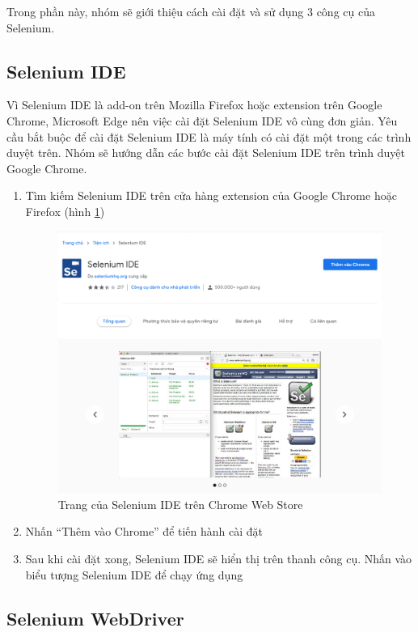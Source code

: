 \documentclass[./../main_file.tex]{subfiles}
\begin{document}
	
	Trong phần này, nhóm sẽ giới thiệu cách cài đặt và sử dụng 3 công cụ của Selenium.
		
	\subsection{Selenium IDE}
	
	Vì Selenium IDE là add-on trên Mozilla Firefox hoặc extension trên Google Chrome, Microsoft Edge nên việc cài đặt Selenium IDE vô cùng đơn giản. Yêu cầu bắt buộc để cài đặt Selenium IDE là máy tính có cài đặt một trong các trình duyệt trên. Nhóm sẽ hướng dẫn các bước cài đặt Selenium IDE trên trình duyệt Google Chrome.
	
	\begin{enumerate}
		\item Tìm kiếm Selenium IDE trên cửa hàng extension của Google Chrome hoặc Firefox (hình \ref{fig:ide_chrome})
		\begin{figure}
			\includegraphics[width=\linewidth]{./images/ide_install.png}
			\caption{Trang của Selenium IDE trên Chrome Web Store}
			\label{fig:ide_chrome}
		\end{figure}
		\item Nhấn “Thêm vào Chrome” để tiến hành cài đặt %
		\item Sau khi cài đặt xong, Selenium IDE sẽ hiển thị trên thanh công cụ. Nhấn vào biểu tượng Selenium IDE để chạy ứng dụng
	\end{enumerate}

	\subsection{Selenium WebDriver}
	
\end{document}
